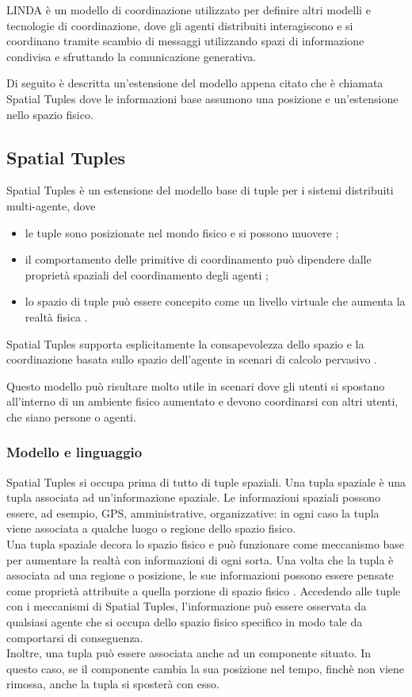 LINDA è un modello di coordinazione utilizzato per definire altri modelli e tecnologie di coordinazione, dove gli agenti distribuiti interagiscono e si coordinano tramite scambio di messaggi utilizzando spazi di informazione condivisa e sfruttando la comunicazione generativa.

Di seguito è descritta un'estensione del modello appena citato che è chiamata Spatial Tuples dove le informazioni base assumono una posizione e un'estensione nello spazio fisico.

\subsection{Spatial Tuples}
Spatial Tuples è un estensione del modello base di tuple per i sistemi distribuiti multi-agente, dove
\begin{itemize}
\item le tuple sono posizionate nel mondo fisico e si possono muovere \cite{SpatialTuples};
\item il comportamento delle primitive di coordinamento può dipendere dalle proprietà spaziali del coordinamento degli agenti \cite{SpatialTuples};
\item lo spazio di tuple può essere concepito come un livello virtuale che aumenta la realtà fisica \cite{SpatialTuples}.
\end{itemize}
Spatial Tuples supporta esplicitamente la consapevolezza dello spazio e la coordinazione basata sullo spazio dell'agente in scenari di calcolo pervasivo \cite{SpatialTuples}.

Questo modello può risultare molto utile in scenari dove gli utenti si spostano all'interno di un ambiente fisico aumentato e devono coordinarsi con altri utenti, che siano persone o agenti.

\subsubsection{Modello e linguaggio}
Spatial Tuples si occupa prima di tutto di tuple spaziali. Una tupla spaziale è una tupla associata ad un'informazione spaziale. Le informazioni spaziali possono essere, ad esempio, GPS, amministrative, organizzative: in ogni caso la tupla viene associata a qualche luogo o regione dello spazio fisico.
\\
Una tupla spaziale decora lo spazio fisico e può funzionare come meccanismo base per aumentare la realtà con informazioni di ogni sorta. Una volta che la tupla è associata ad una regione o posizione, le sue informazioni possono essere pensate come proprietà attribuite a quella porzione di spazio fisico \cite{SpatialTuples}. Accedendo alle tuple con i meccanismi di Spatial Tuples, l'informazione può essere osservata da qualsiasi agente che si occupa dello spazio fisico specifico in modo tale da comportarsi di conseguenza.
\\
Inoltre, una tupla può essere associata anche ad un componente situato. In questo caso, se il componente cambia la sua posizione nel tempo, finchè non viene rimossa, anche la tupla si sposterà con esso.

